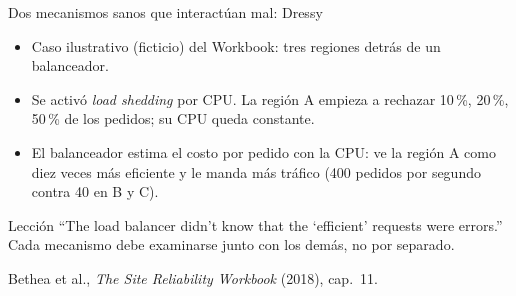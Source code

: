 \documentclass[institutional,screen,none]{ua-engineering-v6-beamer}
\begin{document}
\begin{frame}{Dos mecanismos sanos que interactúan mal: Dressy}
\begin{itemize}
\item Caso ilustrativo (ficticio) del Workbook: tres regiones detrás de un balanceador.
\item Se activó \emph{load shedding} por CPU. La región A empieza a rechazar 10\,\%, 20\,\%, 50\,\% de los pedidos; su CPU queda constante.
\item El balanceador estima el costo por pedido con la CPU: ve la región A como diez veces más eficiente y le manda más tráfico (400 pedidos por segundo contra 40 en B y C).
\end{itemize}

\begin{alertblock}{Lección}
``The load balancer didn't know that the `efficient' requests were errors.'' Cada mecanismo debe examinarse junto con los demás, no por separado.
\end{alertblock}

{\scriptsize\color{UAIngMuted}Bethea et al., \emph{The Site Reliability Workbook} (2018), cap.~11.}
\end{frame}

\end{document}
